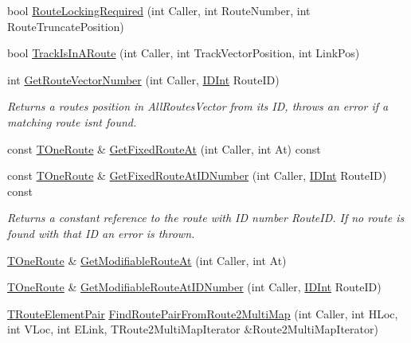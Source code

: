 \begin{DoxyCompactItemize}
bool \mbox{\hyperlink{class_t_all_routes_a38ede0231e26c62498999d1873d547a2}{Route\+Locking\+Required}} (int Caller, int Route\+Number, int Route\+Truncate\+Position)
\item 
bool \mbox{\hyperlink{class_t_all_routes_aace498b67ccef13364a1afa1f5f15311}{Track\+Is\+In\+A\+Route}} (int Caller, int Track\+Vector\+Position, int Link\+Pos)
\item 
\mbox{\label{class_t_all_routes_a1913c6b3db0107874816d94a4d77e7a8}} 
int \mbox{\hyperlink{class_t_all_routes_a1913c6b3db0107874816d94a4d77e7a8}{Get\+Route\+Vector\+Number}} (int Caller, \mbox{\hyperlink{class_i_d_int}{I\+D\+Int}} Route\+ID)
\begin{DoxyCompactList}\small\item\em Returns a route\textquotesingle{}s position in All\+Routes\+Vector from its ID, throws an error if a matching route isn\textquotesingle{}t found. \end{DoxyCompactList}\item 
const \mbox{\hyperlink{class_t_one_route}{T\+One\+Route}} \& \mbox{\hyperlink{class_t_all_routes_a7d9f820738af6314f2b9a4a1f52bb64a}{Get\+Fixed\+Route\+At}} (int Caller, int At) const
\item 
\mbox{\label{class_t_all_routes_a415c16a43e8e997c82226987e7bffc59}} 
const \mbox{\hyperlink{class_t_one_route}{T\+One\+Route}} \& \mbox{\hyperlink{class_t_all_routes_a415c16a43e8e997c82226987e7bffc59}{Get\+Fixed\+Route\+At\+I\+D\+Number}} (int Caller, \mbox{\hyperlink{class_i_d_int}{I\+D\+Int}} Route\+ID) const
\begin{DoxyCompactList}\small\item\em Returns a constant reference to the route with ID number Route\+ID. If no route is found with that ID an error is thrown. \end{DoxyCompactList}\item 
\mbox{\hyperlink{class_t_one_route}{T\+One\+Route}} \& \mbox{\hyperlink{class_t_all_routes_a8b522eb0d7aa415c3648d464c2885484}{Get\+Modifiable\+Route\+At}} (int Caller, int At)
\item 
\mbox{\hyperlink{class_t_one_route}{T\+One\+Route}} \& \mbox{\hyperlink{class_t_all_routes_a22bbb69a96356c26848fe9c6b154f387}{Get\+Modifiable\+Route\+At\+I\+D\+Number}} (int Caller, \mbox{\hyperlink{class_i_d_int}{I\+D\+Int}} Route\+ID)
\item 
\mbox{\hyperlink{class_t_all_routes_a159a7d547e3d435d109a36cb41193a78}{T\+Route\+Element\+Pair}} \mbox{\hyperlink{class_t_all_routes_a73d2c20327947600e5af57f908359343}{Find\+Route\+Pair\+From\+Route2\+Multi\+Map}} (int Caller, int H\+Loc, int V\+Loc, int E\+Link, T\+Route2\+Multi\+Map\+Iterator \&Route2\+Multi\+Map\+Iterator)

\end{DoxyCompactItemize}
